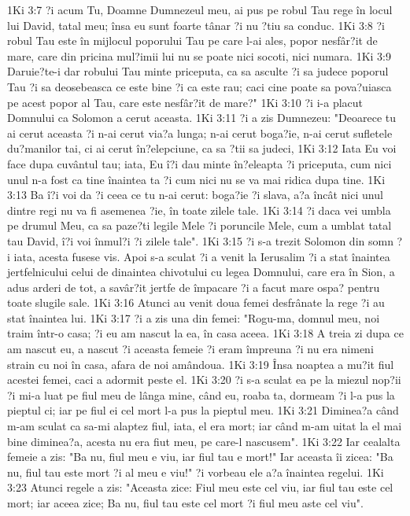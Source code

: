 1Ki 3:7  ?i acum Tu, Doamne Dumnezeul meu, ai pus pe robul Tau rege în locul lui David, tatal meu; însa eu sunt foarte tânar ?i nu ?tiu sa conduc.
1Ki 3:8  ?i robul Tau este în mijlocul poporului Tau pe care l-ai ales, popor nesfâr?it de mare, care din pricina mul?imii lui nu se poate nici socoti, nici numara.
1Ki 3:9  Daruie?te-i dar robului Tau minte priceputa, ca sa asculte ?i sa judece poporul Tau ?i sa deosebeasca ce este bine ?i ca este rau; caci cine poate sa pova?uiasca pe acest popor al Tau, care este nesfâr?it de mare?"
1Ki 3:10  ?i i-a placut Domnului ca Solomon a cerut aceasta.
1Ki 3:11  ?i a zis Dumnezeu: "Deoarece tu ai cerut aceasta ?i n-ai cerut via?a lunga; n-ai cerut boga?ie, n-ai cerut sufletele du?manilor tai, ci ai cerut în?elepciune, ca sa ?tii sa judeci,
1Ki 3:12  Iata Eu voi face dupa cuvântul tau; iata, Eu î?i dau minte în?eleapta ?i priceputa, cum nici unul n-a fost ca tine înaintea ta ?i cum nici nu se va mai ridica dupa tine.
1Ki 3:13  Ba î?i voi da ?i ceea ce tu n-ai cerut: boga?ie ?i slava, a?a încât nici unul dintre regi nu va fi asemenea ?ie, în toate zilele tale.
1Ki 3:14  ?i daca vei umbla pe drumul Meu, ca sa paze?ti legile Mele ?i poruncile Mele, cum a umblat tatal tau David, î?i voi înmul?i ?i zilele tale".
1Ki 3:15  ?i s-a trezit Solomon din somn ?i iata, acesta fusese vis. Apoi s-a sculat ?i a venit la Ierusalim ?i a stat înaintea jertfelnicului celui de dinaintea chivotului cu legea Domnului, care era în Sion, a adus arderi de tot, a savâr?it jertfe de împacare ?i a facut mare ospa? pentru toate slugile sale.
1Ki 3:16  Atunci au venit doua femei desfrânate la rege ?i au stat înaintea lui.
1Ki 3:17  ?i a zis una din femei: "Rogu-ma, domnul meu, noi traim într-o casa; ?i eu am nascut la ea, în casa aceea.
1Ki 3:18  A treia zi dupa ce am nascut eu, a nascut ?i aceasta femeie ?i eram împreuna ?i nu era nimeni strain cu noi în casa, afara de noi amândoua.
1Ki 3:19  Însa noaptea a mu?it fiul acestei femei, caci a adormit peste el.
1Ki 3:20  ?i s-a sculat ea pe la miezul nop?ii ?i mi-a luat pe fiul meu de lânga mine, când eu, roaba ta, dormeam ?i l-a pus la pieptul ci; iar pe fiul ei cel mort l-a pus la pieptul meu.
1Ki 3:21  Diminea?a când m-am sculat ca sa-mi alaptez fiul, iata, el era mort; iar când m-am uitat la el mai bine diminea?a, acesta nu era fiut meu, pe care-l nascusem".
1Ki 3:22  Iar cealalta femeie a zis: "Ba nu, fiul meu e viu, iar fiul tau e mort!" Iar aceasta îi zicea: "Ba nu, fiul tau este mort ?i al meu e viu!" ?i vorbeau ele a?a înaintea regelui.
1Ki 3:23  Atunci regele a zis: "Aceasta zice: Fiul meu este cel viu, iar fiul tau este cel mort; iar aceea zice; Ba nu, fiul tau este cel mort ?i fiul meu aste cel viu".
